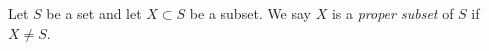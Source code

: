 \documentclass{article}
\begin{document}
Let $S$ be a set and let $X \subset S$ be a subset. We say $X$ is a {\em proper subset} of $S$ if $X \neq S$.
\end{document}
